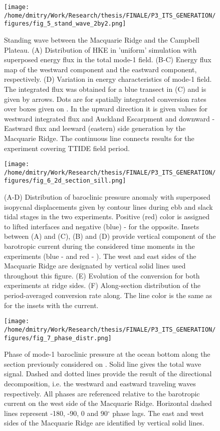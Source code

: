 \documentclass[12pt]{article}
\newcommand{\SCALEO}{2}
\begin{document}
\begin{figure}
	\centering
	\texttt{[image: /home/dmitry/Work/Research/thesis/FINALE/P3\_ITS\_GENERATION/figures/fig\_5\_stand\_wave\_2by2.png]}
	\caption{Standing wave between the Macquarie Ridge and the Campbell Plateau. (A) Distribution 
	of HKE in 'uniform' simulation with superposed energy flux in the total mode-1 field. (B-C) 
	Energy flux map of the westward component and the eastward component, respectively. (D) 
	Variation in energy characteristics of mode-1 field. The integrated flux was obtained for a 	
	blue transect in (C) and is given by arrows. Dots are for spatially integrated conversion rates 
	over boxes given on . In the upward direction it is given values for 
	westward integrated flux and Auckland Escarpment and downward - Eastward flux and leeward 
	(eastern) side generation by the Macquarie Ridge. The continuous line connects results for the 
	experiment covering TTIDE field period.}
	\label{C3.fig:stand_wave}
\end{figure}

\begin{figure}
	\centering
	\texttt{[image: /home/dmitry/Work/Research/thesis/FINALE/P3\_ITS\_GENERATION/figures/fig\_6\_2d\_section\_sill.png]}
	\caption{(A-D) Distribution of baroclinic pressure anomaly with superposed isopycnal 
	displacements given by contour lines during ebb and slack tidal stages in the two experiments. 
	Positive (red) color is assigned to lifted interfaces and negative (blue) - for the opposite. 
	Insets between (A) and (C), (B) and (D) provide vertical component of the barotropic current 
	during the considered time moments in the experiments (blue -  and red - 
	). The west and east sides of the Macquarie Ridge are 
	designated by vertical solid lines used throughout this figure. (E) Evolution of the conversion 
	for both experiments at ridge sides. (F) Along-section distribution of the period-averaged 
	conversion rate along. The line color is the same as for the insets with the current.}
	\label{C3.fig:gen_2d}
\end{figure}

\begin{figure}
	\centering
	\texttt{[image: /home/dmitry/Work/Research/thesis/FINALE/P3\_ITS\_GENERATION/figures/fig\_7\_phase\_distr.png]}
	\caption{Phase of mode-1 baroclinic pressure at the ocean bottom along the section previously 
	considered on . Solid line gives the total wave signal. Dashed and dotted 
	lines provide the result of the directional decomposition, i.e. the westward and eastward 
	traveling waves	respectively. All phases are referenced relative to the barotropic current on 
	the west side of the Macquarie Ridge. Horizontal dashed lines represent -180, -90, 0 and 
	90$^\circ$ phase lags. The east and west sides of the Macquarie Ridge are identified by 
	vertical solid lines.}
\label{C3.fig:2d_phase}
\end{figure}
\end{document}
